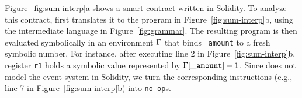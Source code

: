 



\begin{example}
Figure~\ref{fig:sum-interp}a shows a smart contract written in Solidity. To analyze this 
contract, \toolname first translates it to the program in Figure~\ref{fig:sum-interp}b,
using the intermediate language in Figure~\ref{fig:grammar}. The resulting program is then 
evaluated symbolically in an environment $\Gamma$ that binds \texttt{_amount} to a 
fresh symbolic number. %
For instance, after executing line 2 in 
Figure~\ref{fig:sum-interp}b, register \texttt{r1} holds a symbolic value represented 
by $\Gamma[\mathtt{\_amount}] - 1$. Since \toolname does not model the event 
system in Solidity, we turn the corresponding instructions (e.g., line 7 in Figure~\ref{fig:sum-interp}b) 
into \texttt{no-op}s.
\end{example}

